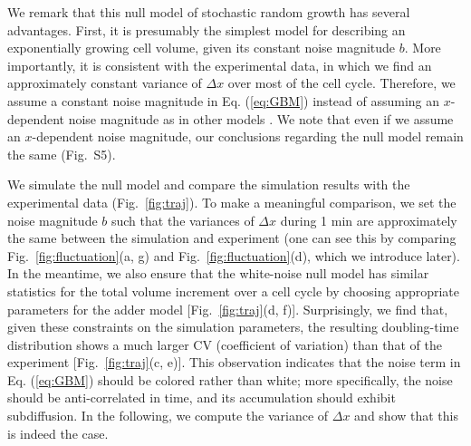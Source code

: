 \documentclass[aps, prl, twocolumn, longbibliography, linenumbers, superscriptaddress]{revtex4-2}
\begin{document}
We remark that this null model of stochastic random growth has several advantages. First, it is presumably the simplest model for describing an exponentially growing cell volume, given its constant noise magnitude $b$. More importantly, it is consistent with the experimental data, in which we find an approximately constant variance of $\Delta x$ over most of the cell cycle. Therefore, we assume a constant noise magnitude in Eq. (\ref{eq:GBM}) instead of assuming an $x$-dependent noise magnitude as in other models \cite{Biswas2014scaling}. We note that even if we assume an $x$-dependent noise magnitude, our conclusions regarding the null model remain the same (Fig.~S5).
	
We simulate the null model and compare the simulation results with the experimental data (Fig.~\ref{fig:traj}). To make a meaningful comparison, we set the noise magnitude $b$ such that the variances of $\Delta x$ during 1 min are approximately the same between the simulation and experiment (one can see this by comparing Fig.~\ref{fig:fluctuation}(a, g) and Fig.~\ref{fig:fluctuation}(d), which we introduce later). In the meantime, we also ensure that the white-noise null model has similar statistics for the total volume increment over a cell cycle by choosing appropriate parameters for the adder model [Fig.~\ref{fig:traj}(d, f)]. Surprisingly, we find that, given these constraints on the simulation parameters, the resulting doubling-time distribution shows a much larger CV (coefficient of variation) than that of the experiment [Fig.~\ref{fig:traj}(c, e)]. This observation indicates that the noise term in Eq. (\ref{eq:GBM}) should be colored rather than white; more specifically, the noise should be anti-correlated in time, and its accumulation should exhibit subdiffusion. In the following, we compute the variance of $\Delta x$ and show that this is indeed the case.
\end{document}
